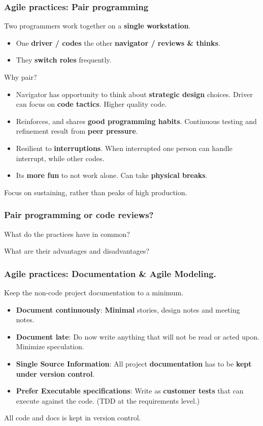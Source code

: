 \documentclass{beamer} %
\newcommand\emc[1]{\textcolor{midred}{\textbf{#1}}}
\begin{document}
\begin{frame}

\frametitle{Agile practices: Pair programming}

Two programmers work together on a \emc{single workstation}. 
\begin{itemize}
\item One \emc{driver / codes} the other \emc{navigator / reviews \& thinks}.
\item They \emc{switch roles} frequently.
\end{itemize}

Why pair?
\begin{itemize}
  \item Navigator has opportunity to think about \emc{strategic design} choices. Driver can focus on  \emc{code tactics}. Higher quality code.
  \item Reinforces, and shares \emc{good programming habits}. Continuous testing and refinement result from \emc{peer pressure}.
  \item Resilient to \emc{interruptions}. When interrupted one person can handle interrupt, while other codes.
  \item Its \emc{more fun} to not work alone. Can take \emc{physical breaks}.
\end{itemize}
Focus on sustaining, rather than peaks of high production.

\end{frame}


\begin{frame}
\frametitle{Pair programming or code reviews?}

What do the practices have in common?

\vspace{5mm}
What are their advantages and disadvantages?

\end{frame}



\begin{frame}

\frametitle{Agile practices: Documentation \& Agile Modeling.}

Keep the non-code project documentation to a minimum.
\begin{itemize}
\item \emc{Document continuously}: \emc{Minimal} stories, design notes and meeting notes.
\item \emc{Document late}: Do now write anything that will not be read or acted upon. Minimize speculation.
\item \emc{Single Source Information}: All project \emc{documentation} has to be \emc{kept under version control}.
\item \emc{Prefer Executable specifications}: Write as \emc{customer tests} that can execute against the code. (TDD at the requirements level.)
\end{itemize}

\vspace{5mm}
All code and docs is kept in version control.
\end{frame}
\end{document}
